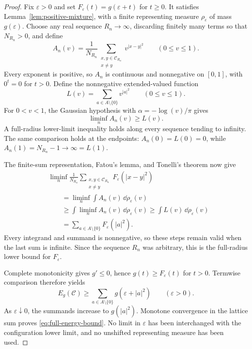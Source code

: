 \begin{proof}
Fix $\varepsilon>0$ and set $F_\varepsilon(t)=g(\varepsilon+t)$ for $t\ge0$.
It satisfies Lemma~\ref{lem:positive-mixture}, with a finite representing
measure $\rho_\varepsilon$ of mass $g(\varepsilon)$.
Choose any real sequence $R_n\to\infty$, discarding finitely many terms so
that $N_{R_n}>0$, and define
\[
 A_n(v)=\frac1{N_{R_n}}
 \sum_{\substack{x,y\in\mathcal C_{R_n}\\x\ne y}}v^{|x-y|^2}
 \qquad(0\le v\le1).
\]
Every exponent is positive, so $A_n$ is continuous and nonnegative on
$[0,1]$, with $0^t=0$ for $t>0$.  Define the nonnegative extended-valued
function
\[
 L(v)=\sum_{a\in A\setminus\{0\}}v^{|a|^2}\qquad(0\le v\le1).
\]
For $0<v<1$, the Gaussian hypothesis with $\alpha=-\log(v)/\pi$ gives
\[
 \liminf_n A_n(v)\ge L(v).
\]
A full-radius lower-limit inequality holds along every sequence tending to
infinity.  The same comparison holds at the endpoints:
$A_n(0)=L(0)=0$, while
$A_n(1)=N_{R_n}-1\to\infty=L(1)$.

The finite-sum representation, Fatou's lemma, and Tonelli's theorem now give
\begin{align*}
 &\liminf_n\frac1{N_{R_n}}
   \sum_{\substack{x,y\in\mathcal C_{R_n}\\x\ne y}}
        F_\varepsilon(|x-y|^2)\\
 &\qquad=\liminf_n\int A_n(v)\,\dd\rho_\varepsilon(v)\\
 &\qquad\ge\int\liminf_n A_n(v)\,\dd\rho_\varepsilon(v)
 \ge\int L(v)\,\dd\rho_\varepsilon(v)\\
 &\qquad=\sum_{a\in A\setminus\{0\}}F_\varepsilon(|a|^2).
\end{align*}
Every integrand and summand is nonnegative, so these steps remain valid when
the last sum is infinite.  Since the sequence $R_n$ was arbitrary, this is
the full-radius lower bound for $F_\varepsilon$.

Complete monotonicity gives $g'\le0$, hence $g(t)\ge F_\varepsilon(t)$ for
$t>0$.  Termwise comparison therefore yields
\[
 E_g(\mathcal C)\ge
 \sum_{a\in A\setminus\{0\}}g(\varepsilon+|a|^2)
 \qquad(\varepsilon>0).
\]
As $\varepsilon\downarrow0$, the summands increase to $g(|a|^2)$.
Monotone convergence in the lattice sum proves \eqref{eq:full-energy-bound}.
No limit in $\varepsilon$ has been interchanged with the configuration lower
limit, and no unshifted representing measure has been used.
\end{proof}

